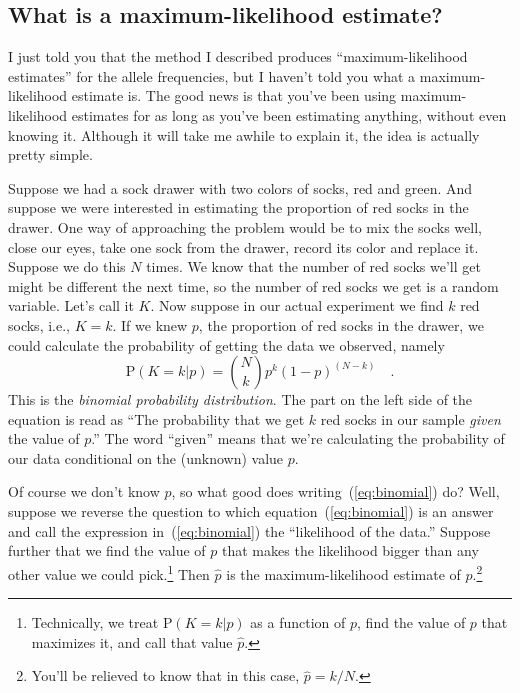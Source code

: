\documentclass[12pt]{article}
\begin{document}
\subsection*{What is a maximum-likelihood
  estimate?}

I just told you that the method I described produces
``maximum-likelihood estimates'' for the allele frequencies, but I
haven't told you what a maximum-likelihood estimate is. The good news
is that you've been using maximum-likelihood estimates for as long as
you've been estimating anything, without even knowing it. Although it
will take me awhile to explain it, the idea is actually pretty simple.

Suppose we had a sock drawer with two colors of socks, red and
green. And suppose we were interested in estimating the proportion of
red socks in the drawer. One way of approaching the problem would be
to mix the socks well, close our eyes, take one sock from the drawer,
record its color and replace it. Suppose we do this $N$ times. We know
that the number of red socks we'll get might be different the next
time, so the number of red socks we get is a random variable. Let's
call it $K$. Now suppose in our actual experiment we find $k$ red
socks, i.e., $K=k$. If we knew $p$, the proportion of red socks in the
drawer, we could calculate the probability of getting the data we
observed, namely
\begin{equation}
\mbox{P}(K=k|p) = {N \choose k} p^k (1-p)^{(N-k)} \quad . \label{eq:binomial}
\end{equation}
This is the {\it binomial probability distribution}. The part on the
left side of the equation is read as ``The probability that we get $k$
red socks in our sample {\it given\/} the value of $p$.'' The word
``given'' means that we're calculating the probability of our data
conditional on the (unknown) value $p$.

Of course we don't know $p$, so what good does
writing~(\ref{eq:binomial}) do? Well, suppose we reverse the question
to which equation~(\ref{eq:binomial}) is an answer and call the
expression in~(\ref{eq:binomial}) the ``likelihood of the data.''
Suppose further that we find the value of $p$ that makes the
likelihood bigger than any other value we could
pick.\footnote{Technically, we treat $\mbox{P}(K=k|p)$ as a function
  of $p$, find the value of $p$ that maximizes it, and call that value
  $\hat p$.} Then $\hat p$ is the maximum-likelihood estimate of
$p$.\footnote{You'll be relieved to know that in this case, $\hat p =
  k/N$.}
\end{document}
